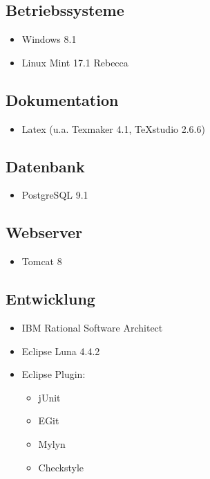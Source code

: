 \documentclass[a4paper]{scrreprt}
\begin{document}
        \subsection{Betriebssysteme}
            \begin{itemize}
            	\item Windows 8.1
            	\item Linux Mint 17.1 Rebecca
            \end{itemize}	
            
        \subsection{Dokumentation}
            \begin{itemize}
            	\item Latex (u.a. Texmaker 4.1, TeXstudio 2.6.6)
            \end{itemize}
            
        \subsection{Datenbank}
           \begin{itemize}
           	\item PostgreSQL 9.1
           \end{itemize}
           
        \subsection{Webserver}
            \begin{itemize}
            	\item Tomcat 8
            \end{itemize}
            
        \subsection{Entwicklung}
           \begin{itemize}
           	\item IBM Rational Software Architect
           	\item Eclipse Luna 4.4.2
           	\item Eclipse Plugin: \\
	           	\begin{itemize}
	           		\item jUnit
	           		\item EGit
	           		\item Mylyn
	           		\item Checkstyle  
	           	\end{itemize} 
           \end{itemize}
           
\end{document}
